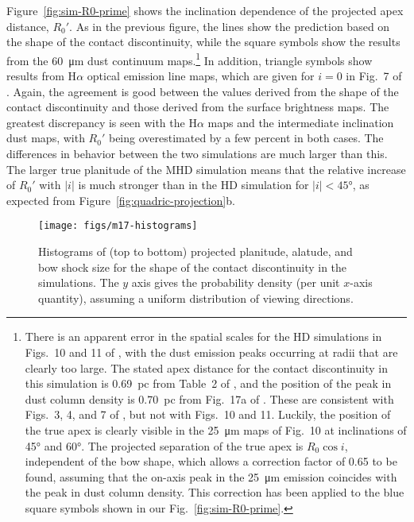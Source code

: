 \documentclass[useAMS, usenatbib, a4paper]{mnras}
\providecommand{\abs}[1]{\lvert#1\rvert}
\begin{document}
Figure~\ref{fig:sim-R0-prime} shows the inclination
dependence of the projected apex distance, \(R_0'\).  As in the
previous figure, the lines show the prediction based on the shape of
the contact discontinuity, while the square symbols show the results
from the \SI{60}{\um} dust continuum maps.\footnote{%
  \label{fn:meyer-correction}
  There is an apparent error in the spatial scales for the HD
  simulations in Figs.~10 and 11 of \citet{Meyer:2017a}, with the dust
  emission peaks occurring at radii that are clearly too large.  The
  stated apex distance for the contact discontinuity in this
  simulation is \SI{0.69}{pc} from Table~2 of \citet{Meyer:2014b}, and
  the position of the peak in dust column density is \SI{0.70}{pc}
  from Fig.~17a of \citet{Meyer:2014b}.  These are consistent with
  Figs.~3, 4, and 7 of \citet{Meyer:2017a}, but not with Figs.~10 and
  11.  Luckily, the position of the true apex is clearly visible in
  the \SI{25}{\um} maps of Fig.~10 at inclinations of \ang{45} and
  \ang{60}.  The projected separation of the true apex is
  \(R_0 \cos i\), independent of the bow shape, which allows a
  correction factor of \num{0.65} to be found, assuming that the
  on-axis peak in the \SI{25}{\um} emission coincides with the peak in
  dust column density.  This correction has been applied to the blue
  square symbols shown in our Fig.~\ref{fig:sim-R0-prime}.} %
In addition, triangle symbols show results from H\(\alpha\) optical
emission line maps, which are given for \(i = 0\) in Fig.~7 of
\citet{Meyer:2017a}.  Again, the agreement is good between the values
derived from the shape of the contact discontinuity and those derived
from the surface brightness maps. The greatest discrepancy is seen
with the H\(\alpha\) maps and the intermediate inclination dust maps, with
\(R_0'\) being overestimated by a few percent in both cases.  The
differences in behavior between the two simulations are much larger
than this.  The larger true planitude of the MHD simulation means that
the relative increase of \(R_0'\) with \(\abs{i}\) is much stronger
than in the HD simulation for \(\abs{i} < \ang{45}\), as expected from
Figure~\ref{fig:quadric-projection}b.

\begin{figure}
  \centering
  \texttt{[image: figs/m17-histograms]}
  \caption[]{Histograms of (top to bottom) projected planitude,
    alatude, and bow shock size for the shape of the contact
    discontinuity in the \citet{Meyer:2017a} simulations. The \(y\)
    axis gives the probability density (per unit \(x\)-axis quantity),
    assuming a uniform distribution of viewing directions.}
  \label{fig:sim-histograms}
\end{figure}
\end{document}
